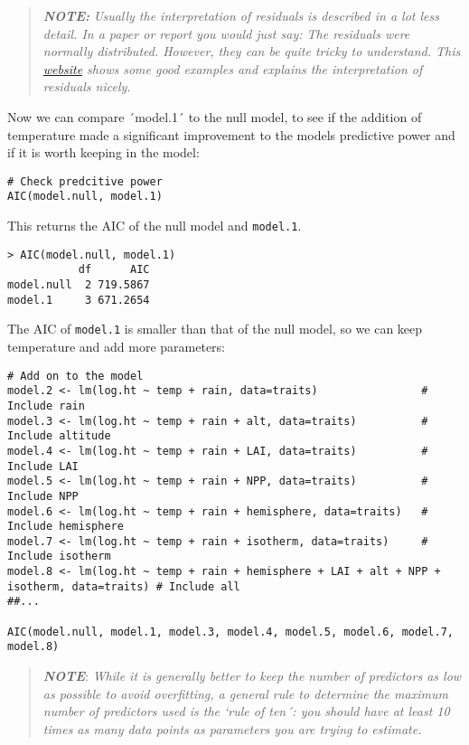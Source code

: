 \documentclass[
]{article}
\begin{document}
\begin{quote}
\textbf{\emph{NOTE:}} \emph{Usually the interpretation of residuals is
described in a lot less detail. In a paper or report you would just say:
The residuals were normally distributed. However, they can be quite
tricky to understand. This
\href{https://rpubs.com/iabrady/residual-analysis}{website} shows some
good examples and explains the interpretation of residuals nicely.}
\end{quote}

Now we can compare ´model.1´ to the null model, to see if the addition
of temperature made a significant improvement to the models predictive
power and if it is worth keeping in the model:

\begin{verbatim}
# Check predcitive power 
AIC(model.null, model.1)
\end{verbatim}

This returns the AIC of the null model and \texttt{model.1}.

\begin{verbatim}
> AIC(model.null, model.1)
           df      AIC
model.null  2 719.5867
model.1     3 671.2654
\end{verbatim}

The AIC of \texttt{model.1} is smaller than that of the null model, so
we can keep temperature and add more parameters:

\begin{verbatim}
# Add on to the model
model.2 <- lm(log.ht ~ temp + rain, data=traits)                # Include rain
model.3 <- lm(log.ht ~ temp + rain + alt, data=traits)          # Include altitude
model.4 <- lm(log.ht ~ temp + rain + LAI, data=traits)          # Include LAI
model.5 <- lm(log.ht ~ temp + rain + NPP, data=traits)          # Include NPP
model.6 <- lm(log.ht ~ temp + rain + hemisphere, data=traits)   # Include hemisphere
model.7 <- lm(log.ht ~ temp + rain + isotherm, data=traits)     # Include isotherm
model.8 <- lm(log.ht ~ temp + rain + hemisphere + LAI + alt + NPP + isotherm, data=traits) # Include all
##...

AIC(model.null, model.1, model.3, model.4, model.5, model.6, model.7, model.8)            
\end{verbatim}

\begin{quote}
\textbf{\emph{NOTE}}: \emph{While it is generally better to keep the
number of predictors as low as possible to avoid overfitting, a general
rule to determine the maximum number of predictors used is the `rule of
ten´: you should have at least 10 times as many data points as
parameters you are trying to estimate.}
\end{quote}
\end{document}
